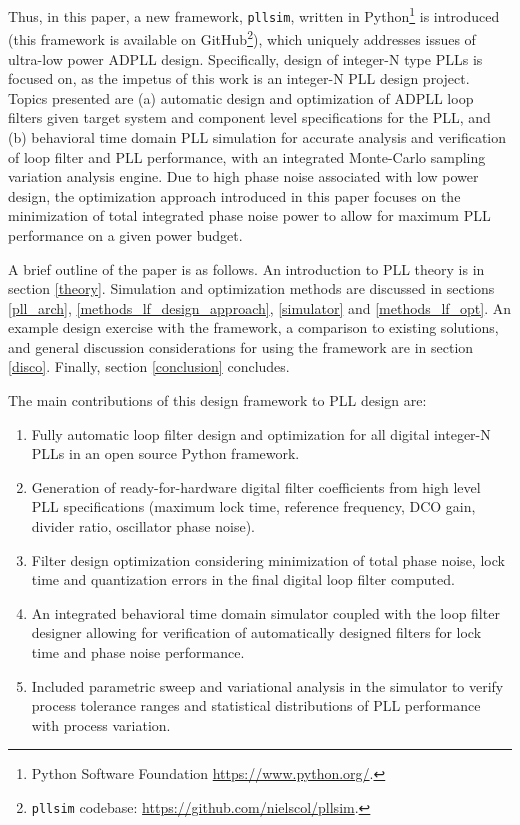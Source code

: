 Thus, in this paper, a new framework, \texttt{pllsim}, written in Python\footnote{Python Software Foundation \url{https://www.python.org/}.} is introduced (this framework is available on GitHub\footnote{\texttt{pllsim} codebase: \url{https://github.com/nielscol/pllsim}.}), which uniquely addresses issues of ultra-low power ADPLL design. Specifically, design of integer-N type PLLs is focused on, as the impetus of this work is an integer-N PLL design project. Topics presented are (a) automatic design and optimization of ADPLL loop filters given target system and component level specifications for the PLL, and (b) behavioral time domain PLL simulation for accurate analysis and verification of loop filter and PLL performance, with an integrated Monte-Carlo sampling variation analysis engine. Due to high phase noise associated with low power design, the optimization approach introduced in this paper focuses on the minimization of total integrated phase noise power to allow for maximum PLL performance on a given power budget.

A brief outline of the paper is as follows. An introduction to PLL theory is in section \ref{theory}. Simulation and optimization methods are discussed in sections \ref{pll_arch}, \ref{methods_lf_design_approach}, \ref{simulator} and \ref{methods_lf_opt}. An example design exercise with the framework, a comparison to existing solutions, and general discussion considerations for using the framework are in section \ref{disco}. Finally, section \ref{conclusion} concludes.
\vspace{1em}

The main contributions of this design framework to PLL design are:
\vspace{-0.8em}
\begin{enumerate}[itemsep=0pt,label=\protect\mycirc{\arabic*}]
	\setlength\itemsep{-0.8em}
	\item Fully automatic loop filter design and optimization for all digital integer-N PLLs in an open source Python framework.
	\item Generation of ready-for-hardware digital filter coefficients from high level PLL specifications (maximum lock time, reference frequency, DCO gain, divider ratio, oscillator phase noise). 
	\item Filter design optimization considering minimization of total phase noise, lock time and quantization errors in the final digital loop filter computed.
	\item An integrated behavioral time domain simulator coupled with the loop filter designer allowing for verification of automatically designed filters for lock time and phase noise performance.
	\item Included parametric sweep and variational analysis in the simulator to verify process tolerance ranges and statistical distributions of PLL performance with process variation.
\end{enumerate}
